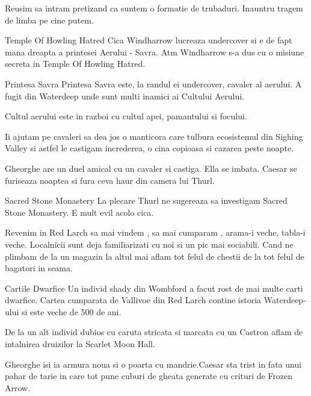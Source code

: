 \documentclass[12pt,oneside]{book}
\begin{document}
Reusim sa intram pretizand ca suntem o formatie de trubaduri. Inauntru tragem
de limba pe cine putem.

\begin{rpg-paperbox}{Temple Of Howling Hatred}
Cica Windharrow lucreaza undercover si e de fapt mana dreapta
a printesei Aerului - Savra. Atm Windharrow s-a dus cu o misiune secreta 
in Temple Of Howling Hatred.
\end{rpg-paperbox}

\begin{rpg-paperbox}{Printesa Savra}
Printesa Savra este, la randul ei undercover, cavaler al aerului. A fugit 
din Waterdeep unde sunt multi inamici ai Cultului Aerului.
\end{rpg-paperbox}

Cultul aerului este in razboi cu cultul apei, pamantului si focului.

Ii ajutam pe cavaleri sa dea jos o manticora care tulbura ecosistemul din 
Sighing Valley si astfel le castigam increderea, o cina copioasa si 
cazarea peste noapte.

Gheorghe are un duel amical cu un cavaler si castiga. Ella se imbata. 
Caesar se furiseaza noaptea si fura ceva haur din camera lui Thurl.

\begin{rpg-paperbox}{Sacred Stone Monastery}
La plecare Thurl ne sugereaza sa investigam Sacred Stone Monastery. E mult
evil acolo cica.
\end{rpg-paperbox}

Revenim in Red Larch sa mai vindem , sa mai cumparam , arama-i veche, 
tabla-i veche. Localnicii sunt deja familiarizati cu noi si un pic 
mai sociabili. Cand ne plimbam de la un magazin la altul mai aflam 
tot felul de chestii de la tot felul de bagatori in seama.

\begin{rpg-paperbox}{Cartile Dwarfice}
Un individ shady din Wombford a facut rost de mai multe carti dwarfice. 
Cartea cumparata de Vallivoe din Red Larch contine istoria Waterdeep-ului 
si este veche de 500 de ani.
\end{rpg-paperbox}

De la un alt individ dubios cu caruta stricata si marcata cu un Castron
aflam de intalnirea druizilor la Scarlet Moon Hall.

Gheorghe isi ia armura noua si o poarta cu mandrie.Caesar sta trist in 
fata unui pahar de tarie in  care tot pune cuburi de gheata generate cu 
crituri de Frozen Arrow.
\end{document}
